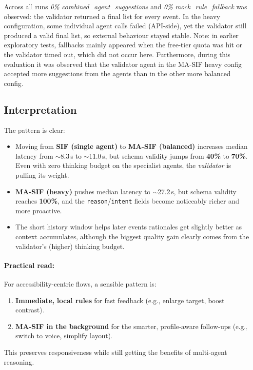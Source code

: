 \documentclass[openany]{book}
\begin{document}
Across all runs \emph{0\% combined\_agent\_suggestions} and \emph{0\% mock\_rule\_fallback} was observed: the validator returned a final list for every event. In the heavy configuration, some individual agent calls failed (API-side), yet the validator still produced a valid final list, so external behaviour stayed stable.  
Note: in earlier exploratory tests, fallbacks mainly appeared when the free-tier quota was hit or the validator timed out, which did not occur here. Furthermore, during this evaluation it was observed that the validator agent in the MA-SIF heavy config accepted more suggestions from the agents than in the other more balanced config.

\subsection*{Interpretation}
The pattern is clear:
\begin{itemize}
    \item Moving from \textbf{SIF (single agent)} to \textbf{MA\mbox{-}SIF (balanced)} increases median latency from $\sim$8.3\,s to $\sim$11.0\,s, but schema validity jumps from \textbf{40\%} to \textbf{70\%}. Even with zero thinking budget on the specialist agents, the \emph{validator} is pulling its weight.
    \item \textbf{MA\mbox{-}SIF (heavy)} pushes median latency to $\sim$27.2\,s, but schema validity reaches \textbf{100\%}, and the \texttt{reason}/\texttt{intent} fields become noticeably richer and more proactive.
    \item The short history window helps later events rationales get slightly better as context accumulates, although the biggest quality gain clearly comes from the validator’s (higher) thinking budget.
\end{itemize}

\paragraph{Practical read:} For accessibility-centric flows, a sensible pattern is:
\begin{enumerate}
    \item \textbf{Immediate, local rules} for fast feedback (e.g., enlarge target, boost contrast).
    \item \textbf{MA-SIF in the background} for the smarter, profile-aware follow-ups (e.g., switch to voice, simplify layout).
\end{enumerate}
This preserves responsiveness while still getting the benefits of multi-agent reasoning.
\end{document}
